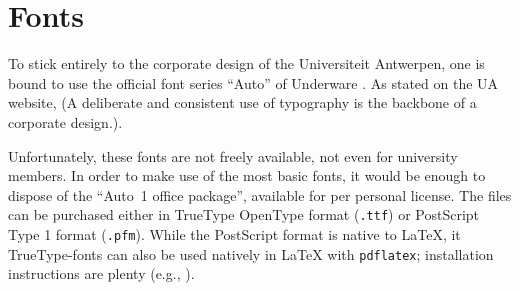 \section{Fonts}

To stick entirely to the corporate design of the Universiteit Antwerpen, one is bound to use the official font series \enquote{Auto} of Underware \cite{Underware::ATI}. As stated on the UA website,  (A deliberate and consistent use of typography is the backbone of a corporate design.). 

Unfortunately, these fonts are not freely available, not even for university members. In order to make use of the most basic fonts, it would be enough to dispose of the \enquote{Auto~1 office package}, available for  per personal license. The files can be purchased either in TrueType OpenType format (\lstinline!.ttf!) or PostScript Type 1 format (\lstinline!.pfm!). While the PostScript format is native to \LaTeX{}, it TrueType-fonts can also be used natively in \LaTeX{} with \lstinline!pdflatex!; installation instructions are plenty (e.g., \cite{Rakityansky::TTF}).



